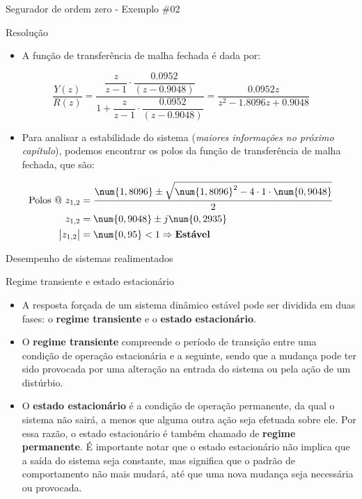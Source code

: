 \begin{frame}{Segurador de ordem zero - Exemplo \#02}
\begin{block}{Resolução}
\begin{itemize}
    \item A função de transferência de malha fechada é dada por:
\end{itemize}
$$\dfrac{Y(z)}{R(z)}=\dfrac{\dfrac{z}{z-1}\cdot\dfrac{\num{0,0952}}{(z-\num{0,9048})}}{1+\dfrac{z}{z-1}\cdot\dfrac{\num{0,0952}}{(z-\num{0,9048})}}=\dfrac{\num{0,0952}z}{z^{2}-\num{1,8096}z+\num{0,9048}}$$
\begin{itemize}
    \item Para analisar a estabilidade do sistema (\textit{maiores informações no próximo capítulo}), podemos encontrar os polos da função de transferência de malha fechada, que são:
\end{itemize}
\begin{align*}
\text{Polos @ }z_{1,2}&=\dfrac{\num{1,8096}\pm\sqrt{\num{1,8096}^{2}-4\cdot1\cdot\num{0,9048}}}{2}\\
			   z_{1,2}&=\num{0,9048}\pm j\num{0,2935}\\
\left| z_{1,2} \right|&=\num{0,95}<1 \Rightarrow \text{\textbf{Estável}} 	
\end{align*}
\end{block}
\end{frame}

\begin{frame}{Desempenho de sistemas realimentados}
\begin{block}{Regime transiente e estado estacionário}
\begin{itemize}
    \item A resposta forçada de um  sistema dinâmico estável pode ser dividida em duas fases: o \textbf{regime transiente} e o \textbf{estado estacionário}.
    \item O \textbf{regime transiente} compreende o período de transição entre uma condição de operação estacionária e a seguinte, sendo que a mudança pode ter sido provocada por uma alteração na entrada do sistema ou pela ação de um distúrbio.
    \item O \textbf{estado estacionário} é a condição de operação permanente, da qual o sistema não sairá, a menos que alguma outra ação seja efetuada sobre ele. Por essa razão, o estado estacionário é também chamado de \textbf{regime permanente}. É importante notar que o estado estacionário não implica que a saída do sistema seja constante, mas significa que o padrão de comportamento não mais mudará, até que uma nova mudança seja necessária ou  provocada.
\end{itemize}
\end{block}
\end{frame}

